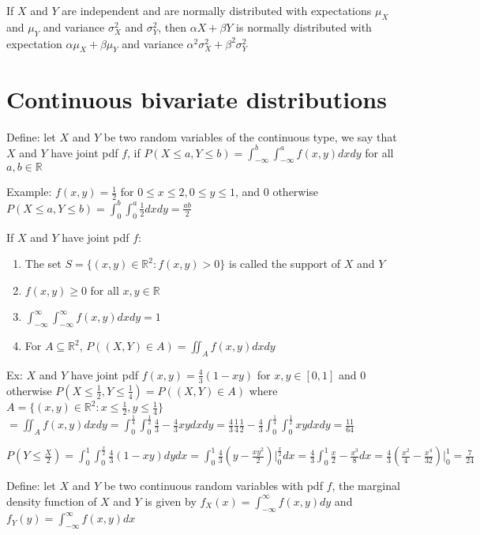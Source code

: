 \documentclass{article}
\begin{document}
If $X$ and $Y$ are independent and are normally distributed with expectations $\mu_X$ and $\mu_Y$ and variance $\sigma_X^2$ and $\sigma_Y^2$, then $\alpha X+\beta Y$ is normally distributed with expectation $\alpha\mu_X+\beta\mu_Y$ and variance $\alpha^2\sigma_X^2+\beta^2\sigma_Y^2$

\section{Continuous bivariate distributions}

Define: let $X$ and $Y$ be two random variables of the continuous type, we say that $X$ and $Y$ have joint pdf $f$, if $P(X\le a,Y\le b)=\int_{-\infty}^b\int_{-\infty}^a f(x,y)dxdy$ for all $a,b\in\mathbb{R}$

Example: $f(x,y)=\frac{1}{2}$ for $0\le x\le2,0\le y\le1$, and $0$ otherwise
$P(X\le a,Y\le b)=\int_0^b\int_0^a\frac{1}{2}dxdy=\frac{ab}{2}$

If $X$ and $Y$ have joint pdf $f$:
\begin{enumerate}
    \item The set $S=\{(x,y)\in\mathbb{R}^2:f(x,y)>0\}$ is called the support of $X$ and $Y$
    \item $f(x,y)\ge0$ for all $x,y\in\mathbb{R}$
    \item $\int_{-\infty}^\infty\int_{-\infty}^\infty f(x,y)dxdy=1$
    \item For $A\subseteq\mathbb{R}^2$, $P((X,Y)\in A)=\iint_Af(x,y)dxdy$
\end{enumerate}

Ex: $X$ and $Y$ have joint pdf $f(x,y)=\frac{4}{3}(1-xy)$ for $x,y\in[0,1]$ and $0$ otherwise
$P(X\le\frac{1}{2},Y\le\frac{1}{4})=P((X,Y)\in A)$ where $A=\{(x,y)\in\mathbb{R}^2:x\le\frac{1}{2},y\le\frac{1}{4}\}$
$=\iint_Af(x,y)dxdy=\int_0^\frac{1}{4}\int_0^\frac{1}{2}\frac{4}{3}-\frac{4}{3}xydxdy=\frac{4}{3}\frac{1}{4}\frac{1}{2}-\frac{4}{3}\int_0^\frac{1}{4}\int_0^\frac{1}{2}xydxdy=\frac{11}{64}$

$P(Y\le\frac{X}{2})=\int_0^1\int_0^\frac{x}{2}\frac{4}{3}(1-xy)dydx=\int_0^1\frac{4}{3}(y-\frac{xy^2}{2})\rvert_0^\frac{x}{2}dx=\frac{4}{3}\int_0^1\frac{x}{2}-\frac{x^3}{8}dx=\frac{4}{3}(\frac{x^2}{4}-\frac{x^4}{32})\rvert_0^1=\frac{7}{24}$

Define: let $X$ and $Y$ be two continuous random variables with pdf $f$, the marginal density function of $X$ and $Y$ is given by $f_X(x)=\int_{-\infty}^\infty f(x,y)dy$ and $f_Y(y)=\int_{-\infty}^\infty f(x,y)dx$
\end{document}
